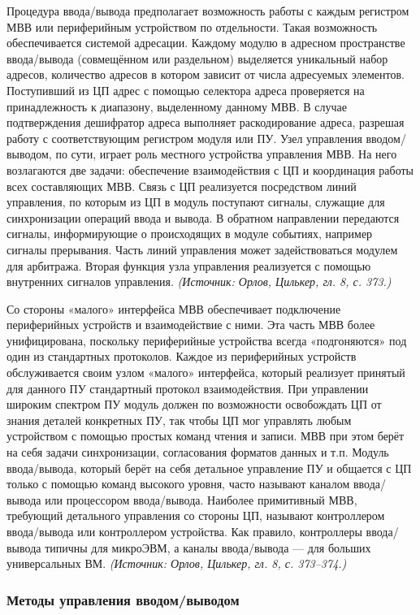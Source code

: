 \documentclass[a4paper,12pt]{article}
\begin{document}
Процедура ввода/вывода предполагает возможность работы с каждым регистром МВВ или периферийным устройством по отдельности. Такая возможность обеспечивается системой адресации. Каждому модулю в адресном пространстве ввода/вывода (совмещённом или раздельном) выделяется уникальный набор адресов, количество адресов в котором зависит от числа адресуемых элементов. Поступивший из ЦП адрес с помощью селектора адреса проверяется на принадлежность к диапазону, выделенному данному МВВ. В случае подтверждения дешифратор адреса выполняет раскодирование адреса, разрешая работу с соответствующим регистром модуля или ПУ. Узел управления вводом/выводом, по сути, играет роль местного устройства управления МВВ. На него возлагаются две задачи: обеспечение взаимодействия с ЦП и координация работы всех составляющих МВВ. Связь с ЦП реализуется посредством линий управления, по которым из ЦП в модуль поступают сигналы, служащие для синхронизации операций ввода и вывода. В обратном направлении передаются сигналы, информирующие о происходящих в модуле событиях, например сигналы прерывания. Часть линий управления может задействоваться модулем для арбитража. Вторая функция узла управления реализуется с помощью внутренних сигналов управления.
\textit{(Источник: Орлов, Цилькер, гл. 8, с. 373.)}

Со стороны «малого» интерфейса МВВ обеспечивает подключение периферийных устройств и взаимодействие с ними. Эта часть МВВ более унифицирована, поскольку периферийные устройства всегда «подгоняются» под один из стандартных протоколов. Каждое из периферийных устройств обслуживается своим узлом «малого» интерфейса, который реализует принятый для данного ПУ стандартный протокол взаимодействия. При управлении широким спектром ПУ модуль должен по возможности освобождать ЦП от знания деталей конкретных ПУ, так чтобы ЦП мог управлять любым устройством с помощью простых команд чтения и записи. МВВ при этом берёт на себя задачи синхронизации, согласования форматов данных и т.п. Модуль ввода/вывода, который берёт на себя детальное управление ПУ и общается с ЦП только с помощью команд высокого уровня, часто называют каналом ввода/вывода или процессором ввода/вывода. Наиболее примитивный МВВ, требующий детального управления со стороны ЦП, называют контроллером ввода/вывода или контроллером устройства. Как правило, контроллеры ввода/вывода типичны для микроЭВМ, а каналы ввода/вывода — для больших универсальных ВМ.
\textit{(Источник: Орлов, Цилькер, гл. 8, с. 373--374.)}

\subsubsection{Методы управления вводом/выводом}
\end{document}
